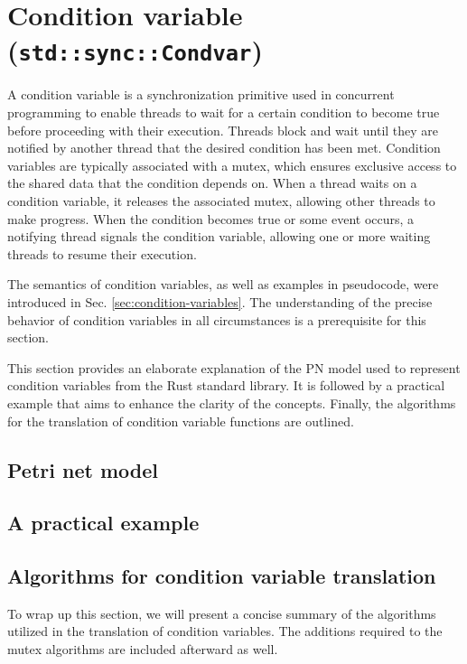 \section{Condition variable (\texttt{std::sync::Condvar})}

A condition variable is a synchronization primitive used in concurrent programming
to enable threads to wait for a certain condition
to become true before proceeding with their execution.
Threads block and wait until they are notified by another thread
that the desired condition has been met.
Condition variables are typically associated with a mutex,
which ensures exclusive access to the shared data that the condition depends on.
When a thread waits on a condition variable, it releases the associated mutex,
allowing other threads to make progress.
When the condition becomes true or some event occurs,
a notifying thread signals the condition variable,
allowing one or more waiting threads to resume their execution.

The semantics of condition variables, as well as examples in pseudocode,
were introduced in Sec. \ref{sec:condition-variables}.
The understanding of the precise behavior of condition variables in all circumstances
is a prerequisite for this section.

This section provides an elaborate explanation of the \acrshort{PN} model
used to represent condition variables from the Rust standard library.
It is followed by a practical example that aims to enhance the clarity of the concepts.
Finally, the algorithms for the translation of condition variable functions are outlined.

\subsection{Petri net model}

\subsection{A practical example}

\subsection{Algorithms for condition variable translation}
\label{sec:condvar-algorithms}

To wrap up this section, we will present a concise summary
of the algorithms utilized in the translation of condition variables.
The additions required to the mutex algorithms are included afterward as well.


